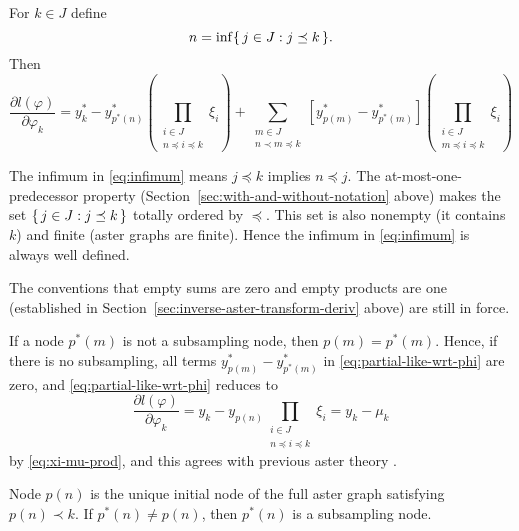 \begin{theorem} \label{th:partial-like-wrt-phi}
For $k \in J$ define
\begin{equation} \label{eq:infimum}
   n = \inf \{\,  j \in J : j \preceq k  \,\}.
\end{equation}
Then
\begin{equation} \label{eq:partial-like-wrt-phi}
   \frac{\partial l(\varphi)}{\partial \varphi_k}
   =
   y^*_k
   -
   y^*_{p^*(n)}
   \left(
   \prod_{\substack{i \in J \\ n \preceq i \preceq k}} \xi_i
   \right)
   +
   \sum_{\substack{m \in J \\ n \prec m \preceq k}}
   \left[ y^*_{p(m)} - y^*_{p^*(m)} \right]
   \left(
   \prod_{\substack{i \in J \\ m \preceq i \preceq k}} \xi_i
   \right)
\end{equation}
\end{theorem}
The infimum in \eqref{eq:infimum} means $j \preceq k$ implies $n \preceq j$.
The at-most-one-predecessor property
(Section~\ref{sec:with-and-without-notation} above)
makes the set $\{\,  j \in J : j \preceq k  \,\}$ totally ordered by $\preceq$.
This set is also nonempty (it contains $k$)
and finite (aster graphs are finite).
Hence the infimum in \eqref{eq:infimum} is always well defined.

The conventions that
empty sums are zero and empty products are one (established in
Section~\ref{sec:inverse-aster-transform-deriv} above) are still in force.

If a node $p^*(m)$ is not a subsampling node, then $p(m) = p^*(m)$.
Hence, if there is no subsampling,
all terms $y^*_{p(m)} - y^*_{p^*(m)}$ in \eqref{eq:partial-like-wrt-phi}
are zero, and \eqref{eq:partial-like-wrt-phi} reduces to
$$
   \frac{\partial l(\varphi)}{\partial \varphi_k}
   =
   y_k - y_{p(n)}
   \prod_{\substack{i \in J \\ n \preceq i \preceq k}} \xi_i
   =
   y_k - \mu_k
$$
by \eqref{eq:xi-mu-prod}, and this
agrees with previous aster theory \citep[Section~3.2]{aster1}.

Node $p(n)$ is the unique initial node of the full aster graph satisfying
$p(n) \prec k$.  If $p^*(n) \neq p(n)$, then $p^*(n)$ is a subsampling node.

